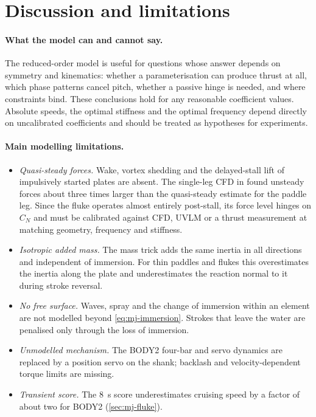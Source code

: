 \section{Discussion and limitations}
\label{sec:mj-discussion}

\paragraph{What the model can and cannot say.}
The reduced-order model is useful for questions whose answer depends on symmetry and
kinematics: whether a parameterisation can produce thrust at all, which phase patterns
cancel pitch, whether a passive hinge is needed, and where constraints bind. These
conclusions hold for any reasonable coefficient values. Absolute speeds, the optimal
stiffness and the optimal frequency depend directly on uncalibrated coefficients and
should be treated as hypotheses for experiments.

\paragraph{Main modelling limitations.}
\begin{itemize}
  \item \emph{Quasi-steady forces.} Wake, vortex shedding and the delayed-stall lift of
    impulsively started plates are absent. The single-leg CFD in \chCFD{} found unsteady
    forces about three times larger than the quasi-steady estimate for the paddle leg.
    Since the fluke operates almost entirely post-stall, its force level hinges on $C_N$
    and must be calibrated against CFD, UVLM or a thrust measurement at matching
    geometry, frequency and stiffness.
  \item \emph{Isotropic added mass.} The mass trick adds the same inertia in all
    directions and independent of immersion. For thin paddles and flukes this
    overestimates the inertia along the plate and underestimates the reaction normal to
    it during stroke reversal.
  \item \emph{No free surface.} Waves, spray and the change of immersion within an
    element are not modelled beyond \cref{eq:mj-immersion}. Strokes that leave the
    water are penalised only through the loss of immersion.
  \item \emph{Unmodelled mechanism.} The BODY2 four-bar and servo dynamics are replaced by
    a position servo on the shank; backlash and velocity-dependent torque limits are
    missing.
  \item \emph{Transient score.} The \SI{8}{s} score underestimates cruising speed by a
    factor of about two for BODY2 (\cref{sec:mj-fluke}).
\end{itemize}

